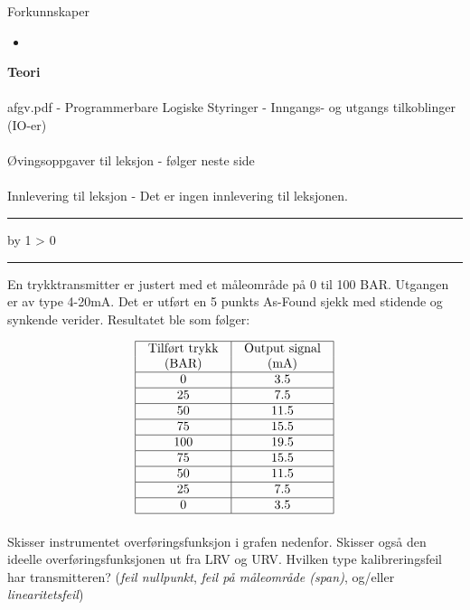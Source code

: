 \documentclass[12pt,a4paper]{article}
\def\oppgave{
            \advance\questnum by 1
            \ifnum \questnum > 0
                 \hrule
                 \vskip 3pt
                 \leftline{Oppgave \the\questnum}
                 \vskip 3pt \fi}
\begin{document}
	Forkunnskaper

	\begin{itemize}[noitemsep]
		\item 

	\end{itemize}
\textbf{Teori}\\\\
afgv.pdf - Programmerbare Logiske Styringer - Inngangs- og utgangs tilkoblinger (IO-er)\\\\
Øvingsoppgaver til leksjon - følger neste side\\\\
Innlevering til leksjon - Det er ingen innlevering til leksjonen. 
\bigskip 
\hrule
\vfil \eject
\vfil \eject

\oppgave{} 

En trykktransmitter er justert med et måleområde på 0 til 100 BAR. Utgangen er av type 4-20mA. 
Det er utført en 5 punkts As-Found sjekk med stidende og synkende verider. Resultatet ble som følger:


$$\vbox{\offinterlineskip
\halign{\strut
\vrule \quad\hfil # \ \hfil & 
\vrule \quad\hfil # \ \hfil \vrule \cr
\noalign{\hrule}
%
Tilført trykk & Output signal \cr
%
(BAR) & (mA) \cr
%
\noalign{\hrule}
%
0 & 3.5 \cr
%
\noalign{\hrule}
%
25 & 7.5 \cr
%
\noalign{\hrule}
%
50 & 11.5 \cr
%
\noalign{\hrule}
%
75 & 15.5 \cr
%
\noalign{\hrule}
%
100 & 19.5 \cr
%
\noalign{\hrule}
%
75 & 15.5 \cr
%
\noalign{\hrule}
%
50 & 11.5 \cr
%
\noalign{\hrule}
%
25 & 7.5 \cr
%
\noalign{\hrule}
%
0 & 3.5 \cr
%
\noalign{\hrule}
} %
}$$ %

Skisser instrumentet overføringsfunksjon i grafen nedenfor. Skisser også den ideelle overføringsfunksjonen ut fra LRV og URV. Hvilken type kalibreringsfeil har transmitteren?  ({\it feil nullpunkt}, {\it feil på måleområde (span)}, og/eller {\it linearitetsfeil})
\end{document}
